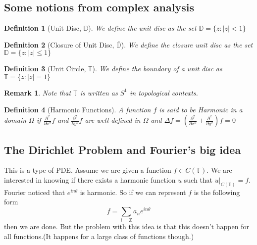 \documentclass{article}
\newtheorem{definition}{Definition}[]
\newtheorem*{remark}{Remark}
\begin{document}
\subsection{Some notions from complex analysis}
\begin{definition}[Unit Disc, $\mathbb{D}$]
We define the unit disc as the set $\mathbb{D}=\{z:|z|<1\}$	
\end{definition}
\begin{definition}[Closure of Unit Disc, $\overline{\mathbb{D}}$]
We define the closure unit disc as the set $\mathbb{D}=\{z:|z|\leq1\}$	
\end{definition}
\begin{definition}[Unit Circle, $\mathbb{T}$]
We define the boundary of a unit disc as $\mathbb{T}=\{z:|z|=1\}$
\end{definition}
\begin{remark}
Note that $\mathbb{T}$ is written as $S^1$ in topological contexts.
\end{remark}
\begin{definition}[Harmonic Functions]
A function $f$ is said to be Harmonic in a domain $\Omega$ if $\frac{\partial^2}{\partial x^2}f$ and $\frac{\partial^2}{\partial y^2}f$ are well-defined in $\Omega$ and $\Delta f=\left(\frac{\partial^2}{\partial x^2}+\frac{\partial^2}{\partial y^2}\right)f=0$
\end{definition}
\subsection{The Dirichlet Problem and Fourier's big idea}
This is a type of PDE. Assume we are given a function $f\in C(\mathbb{T})$. We are interested in knowing if there exists a harmonic function $u$ such that $u|_{C(\mathbb{T})}=f$. Fourier noticed that $e^{in\theta}$ is harmonic. So if we can represent $f$ is the following form
$$f=\sum_{i=\mathbb{Z}}a_ne^{in\theta}$$
then we are done. But the problem with this idea is that this doesn't happen for all functions.(It happens for a large class of functions though.)
\end{document}
